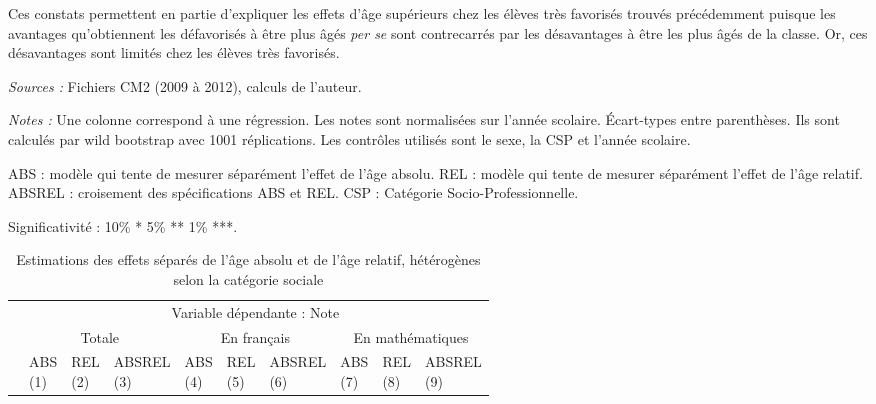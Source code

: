 \documentclass[
]{book}
\begin{document}
\quad Ces constats permettent en partie d'expliquer les effets d'âge supérieurs chez les élèves très favorisés trouvés précédemment puisque les avantages qu'obtiennent les défavorisés à être plus âgés \emph{per se} sont contrecarrés par les désavantages à être les plus âgés de la classe. Or, ces désavantages sont limités chez les élèves très favorisés.

\begin{landscape}\begingroup\fontsize{8}{10}\selectfont

\begin{ThreePartTable}
\begin{TableNotes}
\item \textit{Sources :} Fichiers CM2 (2009 à 2012), calculs de l'auteur.
\item \textit{Notes :} Une colonne correspond à une régression. Les notes sont normalisées sur l'année scolaire. Écart-types entre parenthèses. Ils sont calculés par wild bootstrap avec 1001 réplications. Les contrôles utilisés sont le sexe, la CSP et l'année scolaire.
\item ABS : modèle qui tente de mesurer séparément l'effet de l'âge absolu. REL : modèle qui tente de mesurer séparément l'effet de l'âge relatif. ABSREL : croisement des spécifications ABS et REL. CSP : Catégorie Socio-Professionnelle.
\item Significativité : 10\% * 5\% ** 1\% ***.
\end{TableNotes}
\begin{longtable}[t]{llllllllll}
\caption{\label{tab:agemodelsrelpcs}Estimations des effets séparés de l'âge absolu et de l'âge relatif, hétérogènes selon la catégorie sociale}\\
\toprule
\multicolumn{1}{c}{} & \multicolumn{9}{c}{Variable dépendante : Note} \\
\cmidrule(l{3pt}r{3pt}){2-10}
\multicolumn{1}{c}{} & \multicolumn{3}{c}{Totale} & \multicolumn{3}{c}{En français} & \multicolumn{3}{c}{En mathématiques} \\
\cmidrule(l{3pt}r{3pt}){2-4} \cmidrule(l{3pt}r{3pt}){5-7} \cmidrule(l{3pt}r{3pt}){8-10}
 & \makecell{ABS \\ (1) } & \makecell{REL \\ (2) } & \makecell{ABSREL \\ (3) } & \makecell{ABS \\ (4) } & \makecell{REL \\ (5) } & \makecell{ABSREL \\ (6) } & \makecell{ABS \\ (7) } & \makecell{REL \\ (8) } & \makecell{ABSREL \\ (9) }\\

\end{longtable}
\end{ThreePartTable}
\end{landscape}
\end{document}
